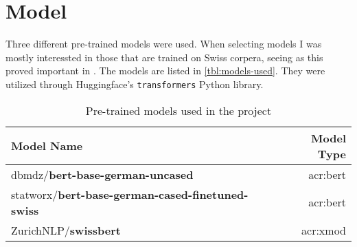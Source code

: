 \section{Model}
\label{sec:model}

\begin{comment}
Here you will present the architecture or model that you have chosen and which is implemented in your work.
Note that putting algorithms in your report is not always desirable, so in certain cases those might be placed in the appendix.
Code is normally to be avoided in the report itself, but may be included in an appendix or submitted as additional documents.
\textbf{(The actual code should also be submitted together with the report, either as a zip-file or as a link to a GitHub repository or similar.)}

Here, or in a separate section (or possibly in the Background section or in the Experimental Setup),
you should also discuss the data that you use in your experiments.

Clearly, a figure showing the architecture is a must, such as Figure~\ref{fig:Architecture}.

\begin{figure}[t!]
    \centering
    \missingfigure{Architecture figure to be added}
    \caption{The missing architecture}
    \label{fig:Architecture}
\end{figure}
\end{comment}

Three different pre-trained models were used. When selecting models I was mostly interessted in those that are trained on Swiss corpera, seeing as this proved important in \cite{scherrerHeLjuVarDial20202020}. The models are listed in \autoref{tbl:models-used}. They were utilized through Huggingface's \texttt{transformers} Python library.

\begin{table}
    \centering
    \begin{tabular}{l|r}
        \toprule
        Model Name                                               & Model Type          \\
        \midrule
        dbmdz/\textbf{bert-base-german-uncased}                  & \acrshort{acr:bert} \\
        statworx/\textbf{bert-base-german-cased-finetuned-swiss} & \acrshort{acr:bert} \\
        ZurichNLP/\textbf{swissbert}                             & \acrshort{acr:xmod} \\
        \bottomrule
    \end{tabular}
    \caption{Pre-trained models used in the project}
    \label{tbl:models-used}
\end{table}

